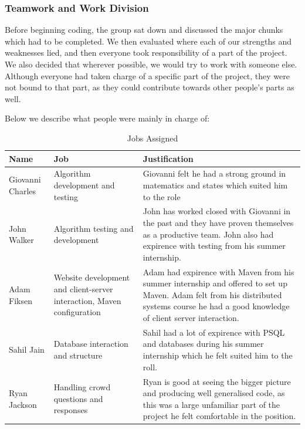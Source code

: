 \documentclass[11pt]{article}
\begin{document}
\subsubsection{Teamwork and Work Division}
Before beginning coding, the group sat down and discussed the major chunks
which had to be completed. We then evaluated where each of our strengths
and weaknesses lied, and then everyone took responsibility of a part of the
project. We also decided that wherever possible, we would try to work with 
someone else. Although everyone had taken charge of a specific part of the
project, they were not bound to that part, as they could contribute towards
other people's parts as well.

Below we describe what people were mainly in charge of:


\begin{table}[H]
\caption{Jobs Assigned}
\begin{center}
\begin{tabular}{|p{2cm}|p{5cm}|p{7cm}|}
Name & Job & Justification\\
\hline

Giovanni Charles & Algorithm development and testing                                       &
Giovanni felt he had a strong ground in matematics and states which suited him to the role
\\ 
John Walker      & Algorithm testing and development                                       &
John has worked closed with Giovanni in the past and they have proven themselves as a productive team.
John also had expirence with testing from his summer internship. 
\\
Adam Fiksen      & Website development and client-server interaction, Maven configuration  &
Adam had expirence with Maven from his summer internship and offered to set up Maven. Adam
felt from his distributed systems course he had a good knowledge of client server interaction.
\\
Sahil Jain       & Database interaction and structure                                      &
Sahil had a lot of expirence with PSQL and databases during his summer internship which he felt
suited him to the roll.
\\
Ryan Jackson     & Handling crowd questions and responses                                  &
Ryan is good at seeing the bigger picture and producing well generalised code, as this was a large
unfamiliar part of the project he felt comfortable in the position.
\\

\end{tabular}
\end{center}
\label{jobs}
\end{table}
\end{document}
